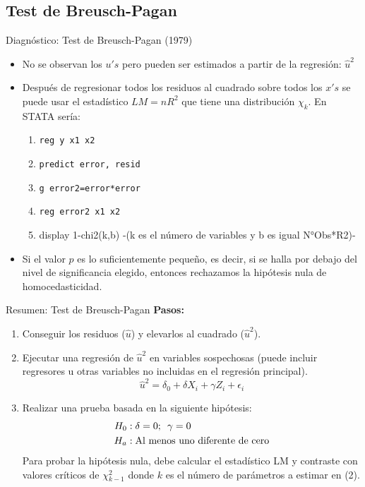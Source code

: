\subsection{Test de Breusch-Pagan}

\begin{frame}{Diagnóstico: Test de Breusch-Pagan (1979)}
	\begin{itemize}
		\item No se observan los $u's$ pero pueden ser estimados a partir de la regresión: $\hat{u}^2$
		\pause
		\item Después de regresionar todos los residuos al cuadrado sobre todos los $x's$ se puede usar el estadístico $LM=nR^2$ que tiene una distribución $\chi_{k}$. En STATA sería:
		\pause
		\begin{enumerate}
			\item \colorbox{codegray}{\texttt{\textcolor{codeblue}{reg} y x1 x2}}
			\item \colorbox{codegray}{\texttt{\textcolor{codeblue}{predict error}, resid}}
			\item \colorbox{codegray}{\texttt{\textcolor{codeblue}{g} error2=\textcolor{codeblue}{error}*\textcolor{codeblue}{error}}}
			\item \colorbox{codegray}{\texttt{\textcolor{codeblue}{reg} error2 x1 x2}}
			\item display 1-chi2(k,b) -(k es el número de variables y b es igual N°Obs*R2)-
		\end{enumerate}
		\pause
		\item Si el valor $p$ es lo suficientemente pequeño, es decir, si se halla por debajo del nivel de significancia elegido, entonces rechazamos la hipótesis nula de homocedasticidad.
	\end{itemize}
\end{frame}
\begin{frame}{Resumen: Test de Breusch-Pagan}
	\textbf{Pasos:}
	\begin{enumerate}
		\item Conseguir los residuos ($\hat{u}$) y elevarlos al cuadrado ($\hat{u}^2$).
		\item Ejecutar una regresión de $\hat{u}^2$ en variables sospechosas (puede incluir regresores u otras variables no incluidas en el regresión principal).
			$$\hat{u}^2 = \delta_0 + \delta X_i + \gamma Z_i + \epsilon_i$$
		\item Realizar una prueba basada en la siguiente hipótesis:
			\begin{align*}
				H_0 &: \delta = 0;\enskip \gamma = 0\\
				H_a &: \textup{Al menos uno diferente de cero}
			\end{align*}
		Para probar la hipótesis nula, debe calcular el estadístico LM y contraste con valores críticos de $\chi{^2_{k-1}}$ donde $k$ es el número de parámetros a estimar en (2).
	\end{enumerate}
\end{frame}
